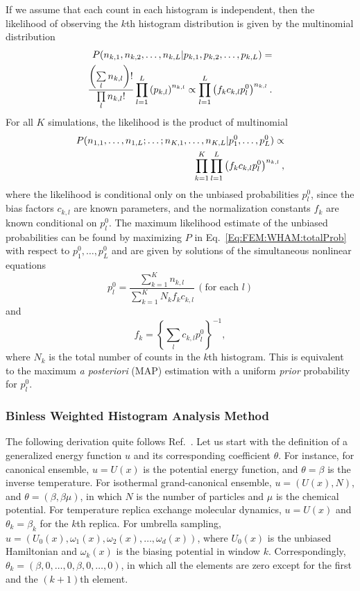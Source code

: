 If we assume that each count in each histogram is independent, then the likelihood of observing the $k$th histogram distribution is given by the multinomial distribution
\begin{align}
P(n_{k,1},n_{k,2},\dots,n_{k,L}|p_{k,1},p_{k,2},\dots,p_{k,L})=\notag\\
\frac{\left(\sum\limits_l n_{k,l}\right)!}{\prod\limits_l n_{k,l}!}\prod\limits_{l=1}^L\left(p_{k,l}\right)^{n_{k,l}}\propto\prod\limits_{l=1}^{L}\left(f_kc_{k,l}p_l^0\right)^{n_{k,l}}.
\end{align}
For all $K$ simulations, the likelihood is the product of multinomial
\begin{align}
P(n_{1,1},\dots,n_{1,L};\dots;n_{K,1},\dots,n_{K,L}|p_1^0,\dots,p_L^0)\propto\notag\\
\prod\limits_{k=1}^K\prod\limits_{l=1}^{L}\left(f_kc_{k,l}p_l^0\right)^{n_{k,l}},
\label{Eq:FEM:WHAM:totalProb}
\end{align}
where the likelihood is conditional only on the unbiased probabilities $p_l^0$, since the bias factors $c_{k,l}$ are known parameters, and the normalization constants $f_k$ are known conditional on $p_l^0$. The maximum likelihood estimate of the unbiased probabilities can be found by maximizing $P$ in Eq.~\ref{Eq:FEM:WHAM:totalProb} with respect to $p_1^0,\dots,p_L^0$ and are given by solutions of the simultaneous nonlinear equations
\begin{equation}
p_l^0=\frac{\sum\limits_{k=1}^K n_{k,l}}{\sum\limits_{k=1}^K N_kf_kc_{k,l}}\, (\text{for each }l)
\end{equation}
and
\begin{equation}
f_k={\left\{\sum\limits_lc_{k,l}p_l^0\right\}}^{-1},
\end{equation}
where $N_k$ is the total number of counts in the $k$th histogram. This is equivalent to the maximum \textit{a posteriori} (MAP) estimation with a uniform \textit{prior} probability for $p_l^0$\cite{FergusonJCC2017}.

\subsubsection{Binless Weighted Histogram Analysis Method\label{Sec:FEM:WHAM_BINLESS}}
The following derivation quite follows Ref.~\cite{TanJCP2012}.
Let us start with the definition of a generalized energy function $u$ and its corresponding coefficient $\theta$. For instance, for canonical ensemble, $u=U(x)$ is the potential energy function, and $\theta=\beta$ is the inverse temperature. For isothermal grand-canonical ensemble, $u=(U(x),N)$, and $\theta=(\beta,\beta\mu)$, in which $N$ is the number of particles and $\mu$ is the chemical potential. For temperature replica exchange molecular dynamics, $u=U(x)$ and $\theta_k=\beta_k$ for the $k$th replica. For umbrella sampling, $u=(U_0(x),\omega_1(x),\omega_2(x),\dots,\omega_d(x))$, where $U_0(x)$ is the unbiased Hamiltonian and $\omega_k(x)$ is the biasing potential in window $k$. Correspondingly, $\theta_k=(\beta,0,\dots,0,\beta,0,\dots,0)$, in which all the elements are zero except for the first and the $(k+1)$th element.

